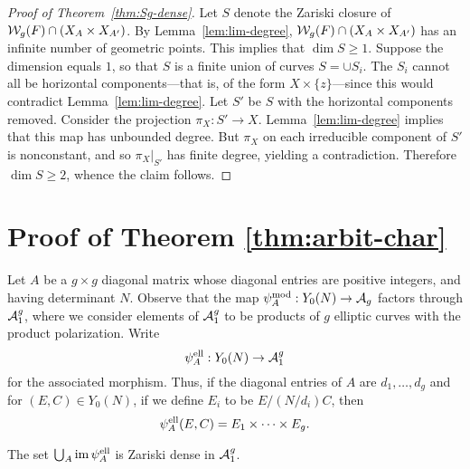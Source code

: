 \documentclass{amsart}
\begin{document}
\begin{proof}[Proof of Theorem~\ref{thm:Sg-dense}]
  Let $S$ denote the Zariski closure of $\mathcal{W}_g(F) \cap (X_A \times X_{A'})$. By Lemma~\ref{lem:lim-degree}, $\mathcal{W}_g(F) \cap (X_A \times X_{A'})$ has an infinite number of geometric points. This implies that $\dim S \geq 1$. Suppose the dimension equals $1$, so that $S$ is a finite union of curves $S = \cup S_i$. The $S_i$ cannot all be horizontal components---that is, of the form $X \times \{z\}$---since this would contradict Lemma~\ref{lem:lim-degree}. Let $S'$ be $S$ with the horizontal components removed. Consider the projection $\pi_X: S' \to X$. Lemma~\ref{lem:lim-degree} implies that this map has unbounded degree. But $\pi_X$ on each irreducible component of $S'$ is nonconstant, and so $\pi_X|_{S'}$ has finite degree, yielding a contradiction. Therefore $\dim S \geq 2$, whence the claim follows.
\end{proof}







\section{Proof of Theorem \ref{thm:arbit-char}}
\label{sec:characteristic-p}

Let $A$ be a $g \times g$ diagonal matrix whose diagonal entries are positive integers, and having determinant $N$. Observe that the map $\psi_{A}^\mathrm{mod}: Y_0(N) \to \mathcal{A}_g$ factors through $\mathcal{A}_1^g$, where we consider elements of $\mathcal{A}_1^g$ to be products of $g$ elliptic curves with the product polarization. Write
\[
\psi_{A}^\mathrm{ell}: Y_0(N) \to \mathcal{A}_1^g
\]
for the associated morphism. Thus, if the diagonal entries of $A$ are $d_1, \ldots, d_g$ and for $(E, C) \in Y_0(N)$, if we define $E_i$ to be $E/(N/d_i)C$, then
\[
  \psi_{A}^\mathrm{ell}(E,C) = E_1 \times \cdots \times E_g.
\]

\begin{theorem}\label{thm:char-p-version}
  The set $\bigcup_A \operatorname{im}\psi_{A}^\mathrm{ell}$ is Zariski dense in $\mathcal{A}_1^g$.
\end{theorem}
\end{document}
